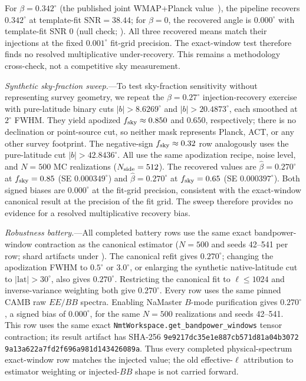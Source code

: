 \documentclass[aps,prd,twocolumn,superscriptaddress,showpacs,preprintnumbers,nofootinbib,longbibliography,floatfix]{revtex4-2}
\begin{document}
For $\beta=0.342^\circ$ (the published joint
WMAP+Planck value~\cite{Eskilt2022}), the pipeline recovers $0.342^\circ$ at
template-fit $\mathrm{SNR}=38.44$; for
$\beta=0$, the recovered angle is $0.000^\circ$ with template-fit SNR $0$
(null check; ). All three recovered
means match their injections at the fixed $0.001^\circ$ fit-grid precision.
The exact-window test therefore finds no resolved multiplicative
under-recovery. This remains a methodology cross-check, not a competitive
sky measurement.

\textit{Synthetic sky-fraction sweep.}---To test sky-fraction sensitivity
without representing survey geometry, we repeat the $\beta=0.27^\circ$
injection-recovery exercise with pure-latitude binary cuts
$|b|>8.6269^\circ$ and $|b|>20.4873^\circ$, each smoothed at $2^\circ$ FWHM.
They yield apodized $f_{\rm sky}\approx0.850$ and $0.650$, respectively;
there is no declination or point-source cut, so neither mask represents Planck,
ACT, or any other survey footprint. The negative-sign $f_{\rm sky}\approx0.32$
row analogously uses the pure-latitude cut $|b|>42.8436^\circ$. All use the same
apodization recipe, noise level, and
$N\!=\!500$ MC realizations ($N_{\rm side}=512$). The recovered values are
$\hat\beta=0.270^\circ$ at $f_{\rm sky}=0.85$ (SE $0.000349^\circ$)
and $\hat\beta=0.270^\circ$ at $f_{\rm sky}=0.65$
(SE $0.000397^\circ$). Both signed biases are
$0.000^\circ$ at the fit-grid precision, consistent with the exact-window
canonical result at the precision of the fit grid. The sweep therefore
provides no evidence for a resolved multiplicative recovery bias.

\emph{Robustness battery.}---All completed battery rows use the same exact
bandpower-window contraction as the canonical estimator ($N=500$ and seeds
42--541 per row; shard artifacts under
).
The canonical refit gives $0.270^\circ$; changing the apodization FWHM to
$0.5^\circ$ or $3.0^\circ$, or enlarging the synthetic native-latitude cut to
$|\mathrm{lat}|>30^\circ$, also gives $0.270^\circ$. Restricting the canonical fit to
$\ell\le1024$ and inverse-variance weighting both give $0.270^\circ$.
Every row uses the same pinned CAMB raw $EE/BB$ spectra. Enabling NaMaster
$B$-mode purification gives $0.270^\circ$, a signed bias of
$0.000^\circ$, for the same $N=500$ realizations and seeds 42--541. This
row uses the same exact
\texttt{NmtWorkspace.get\_bandpower\_windows} tensor contraction; its result
artifact has SHA-256
\texttt{9e9217dc35e1e887\allowbreak{}cb571d81a04b3072\allowbreak{}
9a13a622a7fd2f69\allowbreak{}6a981d143426089a}.
Thus every completed physical-spectrum exact-window row matches the
injected value; the old effective-$\ell$ attribution to estimator weighting
or injected-$BB$ shape is not carried forward.
\end{document}
